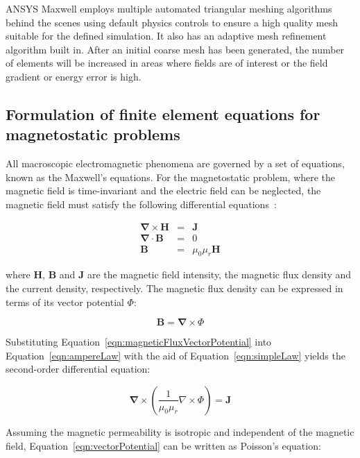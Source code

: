 ANSYS Maxwell employs multiple automated triangular meshing algorithms behind the scenes using default physics controls to ensure a high quality mesh suitable for the defined simulation. It also has an adaptive mesh refinement algorithm built in. After an initial coarse mesh has been generated, the number of elements will be increased in areas where fields are of interest or the field gradient or energy error is high. 

\subsection{Formulation of finite element equations for magnetostatic problems}
\label{subsec:formulation of finite element equations}
All macroscopic electromagnetic phenomena are governed by a set of equations, known as the Maxwell's equations. For the magnetostatic problem, where the magnetic field is time-invariant and the electric field can be neglected, the magnetic field must satisfy the following differential equations~\cite{Maxwell1873}:

\begin{eqnarray}
	\mathbf{\nabla} \times \mathbf{H} &=& \mathbf{J} \label{eqn:ampereLaw} \\
	\mathbf{\nabla} \cdot \mathbf{B} &=& 0 \label{eqn:gaussLaw} \\
	\mathbf{B} &=& \mu_{0}\mu_{r}\mathbf{H} \label{eqn:simpleLaw}
\end{eqnarray}

where $\mathbf{H}$, $\mathbf{B}$ and $\mathbf{J}$ are the magnetic field intensity, the magnetic flux density and the current density, respectively. The magnetic flux density can be expressed in terms of its vector potential $\Phi$:

\begin{equation}
	\mathbf{B} = \mathbf{\nabla} \times \Phi
	\label{eqn:magneticFluxVectorPotential}
\end{equation}

Substituting Equation~\ref{eqn:magneticFluxVectorPotential} into Equation~\ref{eqn:ampereLaw} with the aid of Equation~\ref{eqn:simpleLaw} yields the second-order differential equation:

\begin{equation}
	\mathbf{\nabla} \times \left(\frac{1}{\mu_{0}\mu_{r}}\nabla \times \Phi \right) = \mathbf{J}
	\label{eqn:vectorPotential}
\end{equation}

Assuming the magnetic permeability is isotropic and independent of the magnetic field, Equation~\ref{eqn:vectorPotential} can be written as Poisson's equation:

